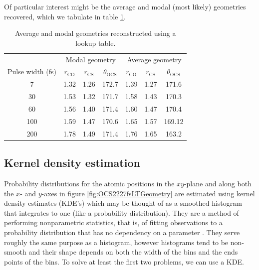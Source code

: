 Of particular interest might be the average and modal (most likely) geometries recovered, which we tabulate in table \ref{table:lookupTableGeometries}.

\begin{table}
  \myfloatalign
  \centering
  \begin{tabularx}{0.9\textwidth}{ccccccc}
    \toprule
    & \multicolumn{3}{c}{Modal geometry} & \multicolumn{3}{c}{Average geometry} \\
    Pulse width (fs) & $r_\mathrm{CO}$ & $r_\mathrm{CS}$ & $\theta_\mathrm{OCS}$ & $r_\mathrm{CO}$ & $r_\mathrm{CS}$ & $\theta_\mathrm{OCS}$ \\
    \midrule
    7 & 1.32 & 1.26 & 172.7 & 1.39 & 1.27 & 171.6 \\
    30 & 1.53 & 1.32 & 171.7 & 1.58 & 1.43 & 170.3 \\
    60 & 1.56 & 1.40 & 171.4 & 1.60 & 1.47 & 170.4 \\
    100 & 1.59 & 1.47 & 170.6 & 1.65 & 1.57 & 169.12 \\
    200 & 1.78 & 1.49 & 171.4 & 1.76 & 1.65 & 163.2 \\
    \bottomrule
  \end{tabularx}
  \caption[Average and modal geometries reconstructed using a lookup table.]
  {Average and modal geometries reconstructed using a lookup table.}
  \label{table:lookupTableGeometries}
\end{table}

\subsection{Kernel density estimation} \label{sec:kde}
Probability distributions for the atomic positions in the $xy$-plane and along both the $x$- and $y$-axes in figure \ref{fig:OCS2227fsLTGeometry} are estimated using kernel density estimates (KDE's) which may be thought of as a smoothed histogram that integrates to one (like a probability distribution). They are a method of performing nonparametric statistics, that is, of fitting observations to a probability distribution that has no dependency on a parameter \citep[\S 20.2-20.3]{Kendall99}. They serve roughly the same purpose as a histogram, however histograms tend to be non-smooth and their shape depends on both the width of the bins and the ends points of the bins. To solve at least the first two problems, we can use a KDE.


